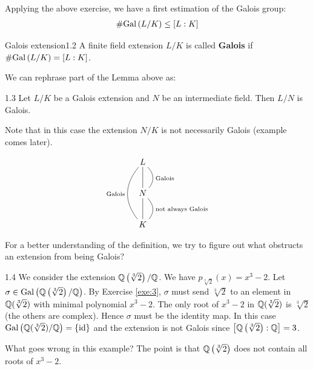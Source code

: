 \documentclass[twoside = false,	%
		headsepline,		%
		parskip = true,
		]{scrbook}						%
\begin{document}
        Applying the above exercise, we have a first estimation of the Galois group:
        \begin{align*}
            \# \mathrm{Gal}\left( L/K\right) \leq [L:K]
        \end{align*}
        
        \begin{definition}{Galois extension}{1.2}
            A finite field extension $L/K$ is called \textbf{Galois} if $\#\mathrm{Gal}\left( L/K\right) = [L:K]$.
        \end{definition}
        We can rephrase part of the Lemma above as:
        
        \begin{corollary}{}{1.3}
            Let $L/K$ be a Galois extension and $N$ be an intermediate field. Then $L/N$ is Galois.
        \end{corollary}
        
        Note that in this case the extension $N/K$ is not necessarily Galois (example comes later).
        
        \begin{equation*}
            \xymatrix
            {
            L\ar@{-}[d]\ar@/_1.5pc/@{-}[dd]_{\text{Galois}}\ar@/^1pc/@{-}[d]^{\text{Galois}} \\
            N\ar@{-}[d]\ar@/^1pc/@{-}[d]^{\text{not always Galois}} \\
            K
            }
        \end{equation*}
        
        For a better understanding of the definition, we try to figure out what obstructs an extension from being Galois?
        \begin{example}{}{1.4}
            We consider the extension $\mathbb Q\left(\sqrt[3]{2}\right)/\mathbb Q$. We have $p_{\sqrt[3]{2}}(x) = x^3-2$. Let $\sigma \in \mathrm{Gal}\left( \mathbb Q\left(\sqrt[3]{2}\right)/\mathbb Q \right)$. By Exercise \ref{exe:3}, $\sigma$ must send $\sqrt[3]{2}$ to an element in $\mathbb Q(\sqrt[3]{2})$ with minimal polynomial $x^3-2$. The only root of $x^3-2$ in $\mathbb Q(\sqrt[3]{2})$ is $\sqrt[3]{2}$ (the others are complex). Hence $\sigma$ must be the identity map. In this case $\mathrm{Gal}\left(  \mathbb Q(\sqrt[3]{2})/\mathbb Q\right) = \{\mathrm{id}\}$ and the extension is not Galois since $\left[\mathbb Q\left(\sqrt[3]{2}\right):\mathbb Q\right]=3$.
        \end{example}
        
        What goes wrong in this example? The point is that $\mathbb Q\left( \sqrt[3]{2}\right)$ does not contain all roots of $x^3-2$.
        
\end{document}
